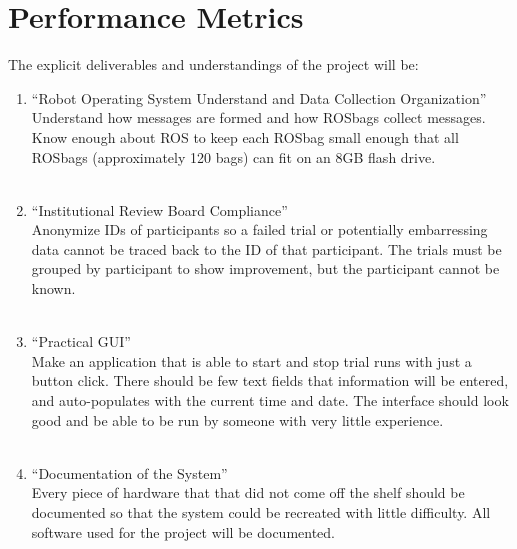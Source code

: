 \documentclass[onecolumn, draftclsnofoot,10pt, compsoc]{IEEEtran}
\begin{document}
\section{Performance Metrics}
	The explicit deliverables and understandings of the project will be:
\begin{enumerate}
	\item \large{“Robot Operating System Understand and Data Collection Organization”}
	\\
	\normalsize Understand how messages are formed and how ROSbags collect messages. Know enough about ROS to keep each ROSbag small enough that all ROSbags (approximately 120 bags) can fit on an 8GB flash drive.\\
	\\
	\item \large {“Institutional Review Board Compliance”}
	\\
	\normalsize Anonymize IDs of participants so a failed trial or potentially embarressing data cannot be traced back to the ID of that participant. The trials must be grouped by participant to show improvement, but the participant cannot be known.\\
	\\
	\item \large {“Practical GUI”}
	\\
	\normalsize Make an application that is able to start and stop trial runs with just a button click. There should be few text fields that information will be entered, and auto-populates with the current time and date. The interface should look good and be able to be run by someone with very little experience.\\
	\\
	\item \large{“Documentation of the System”}
	\\
	\normalsize Every piece of hardware that that did not come off the shelf should be documented so that the system could be recreated with little difficulty. All software used for the project will be documented.\\
\end{enumerate}
\end{document}
